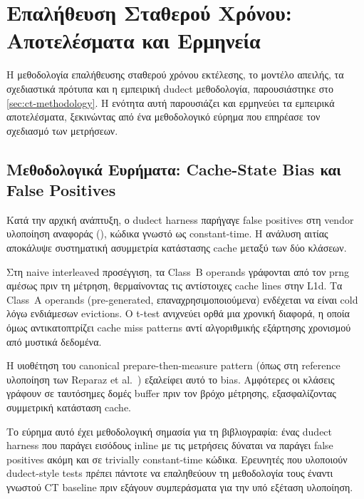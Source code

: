 \ifTODO
\section{Επαλήθευση Σταθερού Χρόνου: Αποτελέσματα και Ερμηνεία}
\label{sec:ct-verification}

Η μεθοδολογία επαλήθευσης σταθερού χρόνου εκτέλεσης, το μοντέλο απειλής, τα
σχεδιαστικά πρότυπα και η εμπειρική dudect μεθοδολογία, παρουσιάστηκε στο
\cref{sec:ct-methodology}. Η ενότητα αυτή παρουσιάζει και ερμηνεύει τα
εμπειρικά αποτελέσματα, ξεκινώντας από ένα μεθοδολογικό εύρημα που επηρέασε
τον σχεδιασμό των μετρήσεων.

\subsection{Μεθοδολογικά Ευρήματα: Cache-State Bias και False Positives}
\label{ssec:ct-cache-bias}

Κατά την αρχική ανάπτυξη, ο dudect harness παρήγαγε false positives στη
vendor υλοποίηση αναφοράς (), κώδικα γνωστό ως
constant-time. Η ανάλυση αιτίας αποκάλυψε συστηματική ασυμμετρία
κατάστασης cache μεταξύ των δύο κλάσεων.

Στη naive interleaved προσέγγιση, τα Class~B operands γράφονται από τον
\gls{prng} αμέσως πριν τη μέτρηση, θερμαίνοντας τις αντίστοιχες cache
lines στην L1d. Τα Class~A operands (pre-generated, επαναχρησιμοποιούμενα)
ενδέχεται να είναι cold λόγω ενδιάμεσων evictions. Ο t-test ανιχνεύει
ορθά μια χρονική διαφορά, η οποία όμως αντικατοπτρίζει cache miss patterns
αντί αλγοριθμικής εξάρτησης χρονισμού από μυστικά δεδομένα.

Η υιοθέτηση του canonical prepare-then-measure pattern (όπως στη reference
υλοποίηση των Reparaz et al.\ \cite{Reparaz2017-dudect}) εξαλείφει αυτό
το bias. Αμφότερες οι κλάσεις γράφουν σε ταυτόσημες δομές buffer πριν
τον βρόχο μέτρησης, εξασφαλίζοντας συμμετρική κατάσταση cache.

Το εύρημα αυτό έχει μεθοδολογική σημασία για τη βιβλιογραφία: ένας dudect
harness που παράγει εισόδους inline με τις μετρήσεις δύναται να παράγει
false positives ακόμη και σε trivially constant-time κώδικα. Ερευνητές
που υλοποιούν dudect-style tests πρέπει πάντοτε να επαληθεύουν τη
μεθοδολογία τους έναντι γνωστού CT baseline πριν εξάγουν συμπεράσματα
για την υπό εξέταση υλοποίηση.

